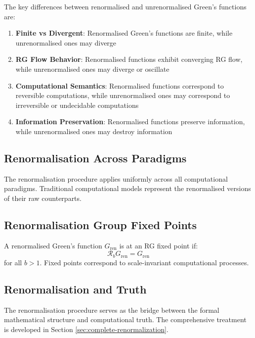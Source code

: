 \begin{theorem}
\label{thm:renormalised-difference}
The key differences between renormalised and unrenormalised Green's functions are:

\begin{enumerate}
\item \textbf{Finite vs Divergent}: Renormalised Green's functions are finite, while unrenormalised ones may diverge
\item \textbf{RG Flow Behavior}: Renormalised functions exhibit converging RG flow, while unrenormalised ones may diverge or oscillate
\item \textbf{Computational Semantics}: Renormalised functions correspond to reversible computations, while unrenormalised ones may correspond to irreversible or undecidable computations
\item \textbf{Information Preservation}: Renormalised functions preserve information, while unrenormalised ones may destroy information
\end{enumerate}
\end{theorem}

\subsection{Renormalisation Across Paradigms}

The renormalisation procedure applies uniformly across all computational paradigms. Traditional computational models represent the renormalised versions of their raw counterparts.

\subsection{Renormalisation Group Fixed Points}

\begin{definition}
\label{def:rg-fixed-points}
A renormalised Green's function $G_{\text{ren}}$ is at an RG fixed point if:
\[
\mathcal{R}_b G_{\text{ren}} = G_{\text{ren}}
\]
for all $b > 1$. Fixed points correspond to scale-invariant computational processes.
\end{definition}

\subsection{Renormalisation and Truth}

The renormalisation procedure serves as the bridge between the formal mathematical structure and computational truth. The comprehensive treatment is developed in Section \ref{sec:complete-renormalization}.
